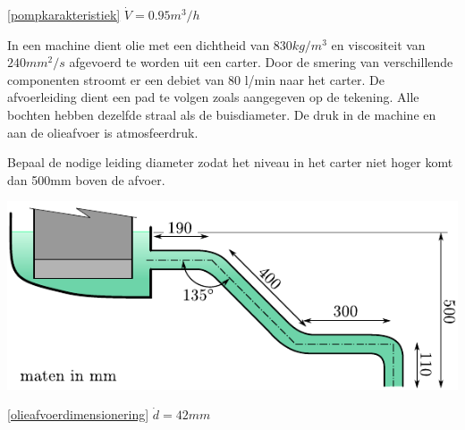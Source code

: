 \begin{antwoord}{\ref{pompkarakteristiek}}
	$\dot{V} = 0.95 \unit{m^3/h}$
\end{antwoord}
\begin{toepassing}[*]
	\label{olieafvoerdimensionering}
In een machine dient olie met een dichtheid van $830 \unit{kg/m^3}$ en viscositeit van $240 \unit{mm^2/s}$ afgevoerd te worden uit een carter. Door de smering van verschillende componenten stroomt er een debiet van 80 l/min naar het carter. De afvoerleiding dient een pad te volgen zoals aangegeven op de tekening. Alle bochten hebben dezelfde straal als de buisdiameter. De druk in de machine en aan de olieafvoer is atmosfeerdruk.
	
Bepaal de nodige leiding diameter zodat het niveau in het carter niet hoger komt dan 500mm boven de afvoer.

	\centering
	\includegraphics{fig/stroming_in_leidingen/olieafvoerdimensionering}
\end{toepassing}
\begin{antwoord}{\ref{olieafvoerdimensionering}}
	$\dot{d} = 42 \unit{mm}$
\end{antwoord}
